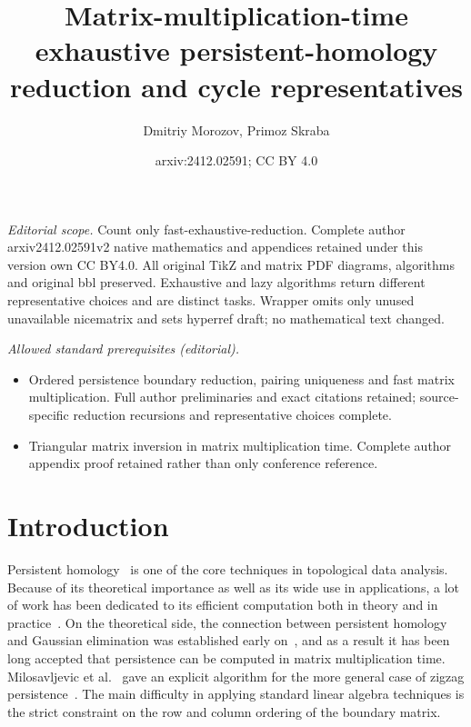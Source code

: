 \documentclass[10pt,a4paper]{article}
\title{Matrix-multiplication-time exhaustive persistent-homology reduction and cycle representatives}
\author{Dmitriy Morozov, Primoz Skraba}
\date{arxiv:2412.02591; CC BY 4.0}
\begin{document}
\maketitle
\noindent\textit{Editorial scope.} Count only fast-exhaustive-reduction. Complete author arxiv2412.02591v2 native mathematics and appendices retained under this version own CC BY4.0. All original TikZ and matrix PDF diagrams, algorithms and original bbl preserved. Exhaustive and lazy algorithms return different representative choices and are distinct tasks. Wrapper omits only unused unavailable nicematrix and sets hyperref draft; no mathematical text changed.\par\medskip
\noindent\textit{Allowed standard prerequisites (editorial).}\begin{itemize}
\item Ordered persistence boundary reduction, pairing uniqueness and fast matrix multiplication. Full author preliminaries and exact citations retained; source-specific reduction recursions and representative choices complete.
\item Triangular matrix inversion in matrix multiplication time. Complete author appendix proof retained rather than only conference reference.
\end{itemize}\medskip
\section{Introduction}

Persistent homology~\cite{edelsbrunner2002topological} is one of the core techniques in topological data analysis. Because of its theoretical importance as well as its wide use in applications, a lot of work has been dedicated to its efficient computation both in theory \cite{milosavljevic2011zigzag,de2011dualities,chen2011output,busaryev2012annotating,kerber2016persistent} and in practice~\cite{bauer2014clear,bauer2017phat,bauer2021ripser,hylton2017performance,henselmanghristl6,wagner2011efficient}.
On the theoretical side, the connection between persistent homology and Gaussian elimination was established early on~\cite{zomorodian2004computing}, and as a result it has been long accepted that persistence can be computed in matrix multiplication time. Milosavljevic et al.~\cite{milosavljevic2011zigzag} gave an explicit algorithm for the more general case of zigzag persistence~\cite{CdS10,CdSM09}. The main difficulty in applying standard linear algebra techniques is the strict constraint on the row and column ordering of the boundary matrix. 
\end{document}
